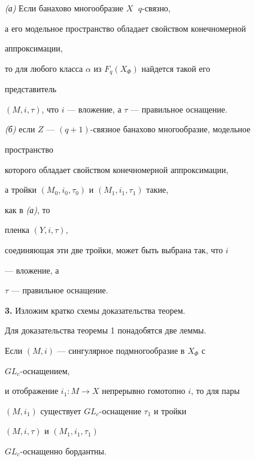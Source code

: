  


\begin{thm} {\em (а)} Если банахово многообразие $X\;$ $q$-связно, 


а его модельное пространство обладает свойством конечномерной 


аппроксимации, 


то для любого класса $\alpha$ из $F_q(X_\Phi)$ найдется такой его 


представитель 


$(M,i,\tau)$, что $i$ --- вложение, а $\tau$ --- правильное оснащение. 


 


{\em (б)} если $Z$ --- $(q+1)$-связное банахово многообразие, модельное 


пространство 


которого обладает свойством конечномерной аппроксимации, 


а тройки $(M_0,i_0,\tau_0)$ и $(M_1,i_1,\tau_1)$ такие, 


как в {\em (а)}, то


пленка $(Y,i,\tau)$, 


соединяющая эти две тройки, может быть выбрана так, что $i$ 


--- вложение, а 


$\tau$ --- правильное оснащение. 


\end{thm}


 


{\bf 3.} Изложим кратко схемы доказательства теорем. 


Для доказательства теоремы 1 понадобятся две леммы. 


 


\begin{lem} Если $(M,i)$ --- сингулярное подмногообразие в $X_\Phi$ с 


$GL_c$-оснащением, 


и отображение $i_1:M\to X$ непрерывно гомотопно $i$, то для пары 


$(M,i_1)$ существует $GL_c$-оснащение $\tau_1$ и тройки 


$(M,i,\tau)$ и $(M_1,i_1,\tau_1)$ 


$GL_c$-оснащенно бордантны. 


\end{lem} 


